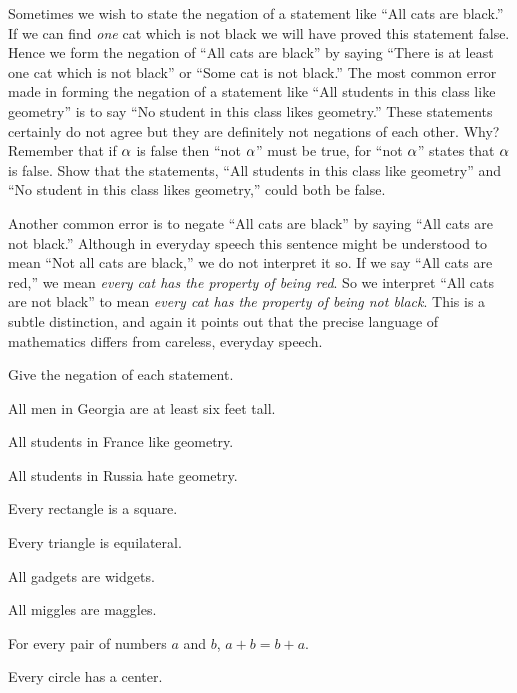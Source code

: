 \documentclass[11pt]{book}
\begin{document}
Sometimes we wish to state the negation of a statement like ``All cats are
black.'' If we can find \emph{one} cat which is not black we will have proved
this statement false. Hence we form the negation of ``All cats are black'' by
saying ``There is at least one cat which is not black'' or ``Some cat is not
black.'' The most common error made in forming the negation of a
statement like ``All students in this class like geometry'' is to say ``No
student in this class likes geometry.'' These statements certainly do not agree
but they are definitely not negations of each other. Why? Remember that if $\alpha$
is false then ``not $\alpha$'' must be true, for ``not $\alpha$'' states that $\alpha$ is
false. Show that the statements, ``All students in this class like geometry'' and
``No student in this class likes geometry,'' could both be false.

Another common error is to negate ``All cats are black'' by saying ``All cats are
not black.'' Although in everyday speech this sentence might be understood to
mean ``Not all cats are black,'' we do not interpret it so. If we say ``All cats
are red,'' we mean \emph{every cat has the property of being red}. So we interpret
``All cats are not black'' to mean \emph{every cat has the property of being not
black}. This is a subtle distinction, and again it points out that the precise
language of mathematics differs from careless, everyday speech.


Give the negation of each statement.

\begin{exercisecols}
\begin{exlist}
\item All men in Georgia are at least six feet tall.
\item All students in France like geometry.
\item All students in Russia hate geometry.
\item Every rectangle is a square.
\item Every triangle is equilateral.
\item All gadgets are widgets.
\item All miggles are maggles.
\item[\stex 8.] For every pair of numbers $a$ and $b$, $a + b = b + a$.
\item[9.] Every circle has a center.
\end{exlist}
\end{exercisecols}
\end{document}
